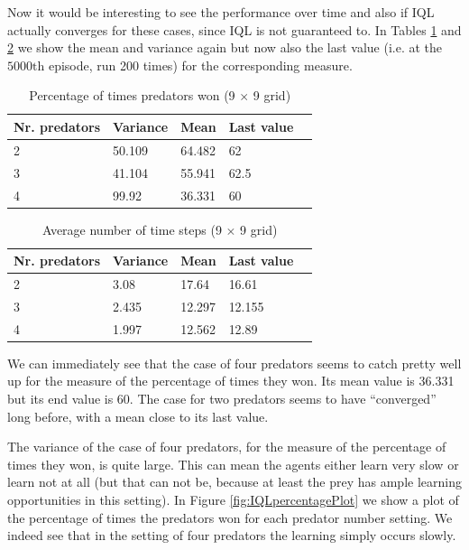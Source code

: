 \FloatBarrier

Now it would be interesting to see the performance over time and also if IQL actually converges for these cases, since IQL is not guaranteed to.
In Tables \ref{tab:percentage} and \ref{tab:timeSteps} we show the mean and variance again but now also the last value (i.e. at the $5000\mathrm{th}$ episode, run 200 times) for the corresponding  measure.

\begin{table}[hbt]
\centering
\begin{tabular}{lllll}
 Nr. predators  &  Variance& Mean & Last value   \\ 
\hline   
 2 & 50.109 & 64.482 & 62   \\ 
 3 & 41.104 & 55.941 & 62.5   \\ 
 4 & 99.92  & 36.331 & 60   \\  
\end{tabular} 
\caption{Percentage of times predators won (9 $\times$ 9 grid)}
\label{tab:percentage}
\end{table}

\begin{table}[hbt]
\centering
\begin{tabular}{lllll}
 Nr. predators  &  Variance& Mean & Last value   \\ 
\hline   
 2 &3.08 & 17.64 & 16.61   \\ 
 3 & 2.435 & 12.297 & 12.155   \\ 
 4 & 1.997  & 12.562 & 12.89   \\  
\end{tabular} 
\caption{Average number of time steps  (9 $\times$ 9 grid)}
\label{tab:timeSteps}
\end{table}

We can immediately see that the case of four predators seems to catch pretty well up for the measure of the percentage of times they won. Its mean value is 36.331 but its end value is 60. The case for two predators seems to have ``converged'' long before, with a mean close to its last value.

The variance of the case of four predators, for the measure of the percentage of times they won, is quite large.
This can mean the agents either learn very slow or learn not at all (but that can not be, because at least the prey has ample learning opportunities in this setting). In Figure \ref{fig:IQLpercentagePlot} we show a plot of the percentage of times the predators won for each predator number setting. We indeed see that in the setting of four predators the learning simply occurs slowly.


